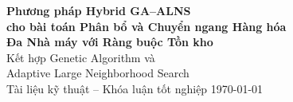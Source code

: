 \documentclass[12pt]{article}
\begin{document}
\begin{titlepage}
  \centering
  \vspace*{2cm}
  {\LARGE\bfseries Phương pháp Hybrid GA--ALNS\\[0.5em]
  cho bài toán Phân bổ và Chuyển ngang Hàng hóa\\[0.5em]
  Đa Nhà máy với Ràng buộc Tồn kho}\\[2cm]
  {\large Kết hợp Genetic Algorithm và\\
  Adaptive Large Neighborhood Search}\\[3cm]
  {\normalsize Tài liệu kỹ thuật -- Khóa luận tốt nghiệp}
  \vfill
  {\large \today}
\end{titlepage}

\tableofcontents
\newpage












\end{document}
